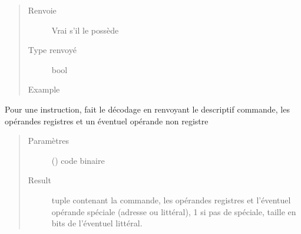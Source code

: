 \documentclass[letterpaper,10pt,french]{sphinxmanual}
\begin{document}
\begin{fulllineitems}
\begin{fulllineitems}
\begin{quote}
\begin{description}
\item[{Renvoie}] \leavevmode
Vrai s’il le possède

\item[{Type renvoyé}] \leavevmode
bool

\item[{Example}] \leavevmode
\begin{sphinxVerbatim}[commandchars=\\\{\}]
\end{sphinxVerbatim}

\begin{sphinxVerbatim}[commandchars=\\\{\}]
\end{sphinxVerbatim}

\end{description}\end{quote}

\end{fulllineitems}


\begin{fulllineitems}
\label{\detokenize{processorengine:processorengine.ProcessorEngine.instructionDecode}}
Pour une instruction, fait le décodage en renvoyant le descriptif commande, les opérandes registres et un éventuel opérande non registre
\begin{quote}\begin{description}
\item[{Paramètres}] \leavevmode
{} () \textendash{} code binaire

\item[{Result}] \leavevmode
tuple contenant la commande, les opérandes registres et l’éventuel opérande spéciale (adresse ou littéral), \sphinxhyphen{}1 si pas de spéciale, taille en bits de l’éventuel littéral.


\end{description}
\end{quote}
\end{fulllineitems}
\end{fulllineitems}
\end{document}
